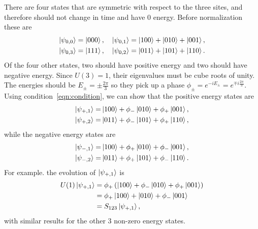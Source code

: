 There are four states that are symmetric with respect to the three sites, and therefore should not change in time and have 0 energy. Before normalization these are
\begin{align}
\left|\psi_{0,0}\right\rangle=\left|000\right\rangle,\quad \left|\psi_{0,1}\right\rangle=\left|100\right\rangle+\left|010\right\rangle+\left|001\right\rangle,
	\nonumber\\
\left|\psi_{0,3}\right\rangle=\left|111\right\rangle,\quad \left|\psi_{0,2}\right\rangle=\left|011\right\rangle+\left|101\right\rangle+\left|110\right\rangle.
	\label{eqn:zero}
\end{align}
Of the four other states, two should have positive energy and two should have negative energy. Since $U(3)=1$, their eigenvalues must be cube roots of unity. The energies should be $E_\pm = \pm\frac{2\pi}{3}$ so they pick up a phase $\phi_\pm =e^{-iE_\pm} = e^{\mp i\frac{2\pi}{3}}$. Using condition~\ref{eqn:condition}, we can show that the positive energy states are
\begin{align}
\left|\psi_{+,1}\right\rangle=&\left|100\right\rangle + \phi_-\left|010\right\rangle + \phi_+\left|001\right\rangle,\nonumber\\
\left|\psi_{+,2}\right\rangle=&\left|011\right\rangle + \phi_-\left|101\right\rangle + \phi_+\left|110\right\rangle,\label{eqn:plus}
\end{align}
while the negative energy states are 
\begin{align}
\left|\psi_{-,1}\right\rangle=&\left|100\right\rangle + \phi_+\left|010\right\rangle + \phi_-\left|001\right\rangle,\nonumber\\
\left|\psi_{-,2}\right\rangle=&\left|011\right\rangle + \phi_+\left|101\right\rangle + \phi_-\left|110\right\rangle.\label{eqn:min}
\end{align}
For example. the evolution of $\left|\psi_{+,1}\right\rangle$ is
\begin{align}
U(1)\left|\psi_{+,1}\right\rangle &= \phi_+ \left(\left|100\right\rangle + \phi_-\left|010\right\rangle + \phi_+
	\left|001\right\rangle\right)\nonumber\\
&= \phi_+\left|100\right\rangle + \left|010\right\rangle +\phi_- \left|001\right\rangle\nonumber\\
&= S_{123}\left|\psi_{+,1}\right\rangle,
\end{align}
with similar results for the other 3 non-zero energy states.

